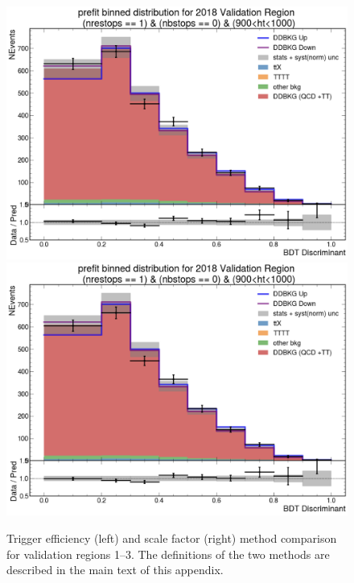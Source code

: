 \documentclass[twoside]{article}
\begin{document}
\begin{figure}[!t]
    \includegraphics[width=.45\columnwidth]{plots/Trigger/TriggerReview/eff3.png}
    \includegraphics[width=.45\columnwidth]{plots/Trigger/TriggerReview/SF3.png}

    \caption{
        Trigger efficiency (left) and scale factor (right) method comparison for validation regions 1–3.  
        The definitions of the two methods are described in the main text of this appendix.
    }
\end{figure}
\end{document}
